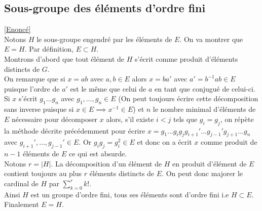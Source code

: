 \documentclass[8pt]{book}
\begin{document}
	\subsection{Sous-groupe des éléments d'ordre fini }
	\label{Sous-groupes des éléments d'ordre fini corrigé}
	\textcolor{blue}{\hyperref[Sous-groupe des éléments d'ordre fini]{[Enoncé]}}\\
	Notons $H$ le sous-groupe engendré par les éléments de $E$. On va montrer que $E=H$. Par définition, $E\subset H$.\\
	Montrons d'abord que tout élément de $H$ s'écrit comme produit d'éléments distincts de $G$.\\
	On remarque que si $x=ab$ avec $a,b\in E$ alors $x=ba'$ avec $a'=b^{-1}ab\in E$ puisque l'ordre de $a'$ est le même que celui de $a$ en tant que conjugué de celui-ci.\\
	Si $x$ s'écrit $g_1\dots g_n$ avec $g_1,\dots,g_n\in E$ (On peut toujours écrire cette décomposition sans inverse puisque si $x\in E\implies x^{-1}\in E$) et $n$ le nombre minimal d'éléments de $E$ nécessaire pour décomposer $x$ alors, s'il existe $i<j$ tels que $g_i=g_j$, on répète la méthode décrite précédemment pour écrire $x=g_1\dots g_ig_jg_{i+1}'\dots g_{j-1}'g_{j+1}\dots g_n$ avec $g_{i+1}',\dots,g_{j-1}'\in E$. Or $g_ig_j=g_i^2\in E$ et donc on a écrit $x$ comme produit de $n-1$ éléments de $E$ ce qui est absurde.\\
	Notons $r=|H|$. La décomposition d'un élément de $H$ en produit d'élément de $E$ contient toujours au plus $r$ éléments distincts de $E$. On peut donc majorer le cardinal de $H$ par $\displaystyle\sum\limits_{k=0}^rk!$.\\
	Ainsi $H$ est un groupe d'ordre fini, tous ses éléments sont d'ordre fini i.e $H\subset E$.\\
	Finalement $E=H$.
	
\end{document}
